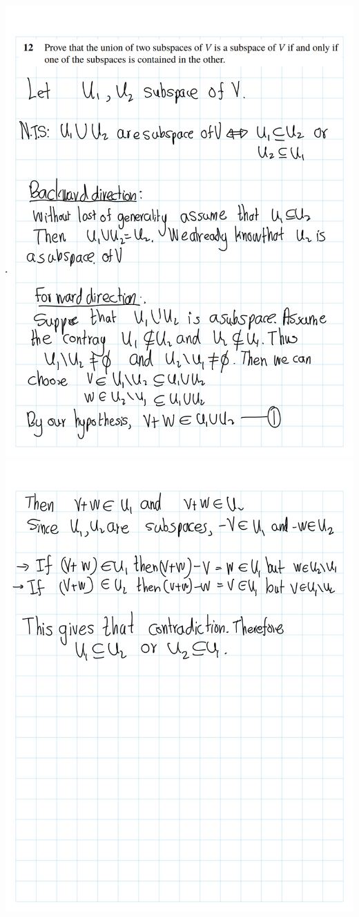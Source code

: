 \documentclass[
]{book}
\theoremstyle{definition}
\theoremstyle{definition}
\theoremstyle{definition}
\theoremstyle{definition}
\theoremstyle{remark}
\begin{document}
\begin{enumerate}
  \includegraphics{fig/Ex1C/Ex/Ex-12.png}
  \includegraphics{fig/Ex1C/Ex/Ex-13.png}

\end{enumerate}
\end{document}
